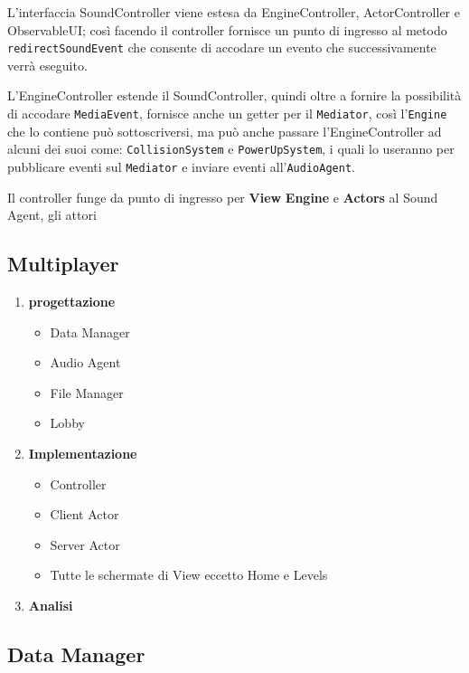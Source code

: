         L'interfaccia SoundController viene estesa da EngineController, ActorController e ObservableUI; così facendo il controller fornisce un punto di ingresso al metodo \texttt{redirectSoundEvent} che consente di accodare un evento che successivamente verrà eseguito.
        
        L'EngineController estende il SoundController, quindi oltre a fornire la possibilità di accodare \texttt{MediaEvent}, fornisce anche un getter per il \texttt{Mediator}, così l'\texttt{Engine} che lo contiene può sottoscriversi, ma può anche passare l'EngineController ad alcuni dei suoi come:
        \texttt{CollisionSystem} e \texttt{PowerUpSystem}, i quali lo useranno per pubblicare eventi sul \texttt{Mediator} e inviare eventi all'\texttt{AudioAgent}.

        
        
        Il controller funge da punto di ingresso per \textbf{View} \textbf{Engine} e \textbf{Actors} al Sound Agent, gli attori 
        
    \subsection{Multiplayer}
        



\begin{enumerate}
    \item \textbf{progettazione}
        \begin{itemize}
	        \item Data Manager
	        \item Audio Agent
	        \item File Manager
        	\item Lobby
        \end{itemize}
    \item \textbf{Implementazione}
        \begin{itemize}
            \item Controller
	        \item Client Actor
	        \item Server Actor
            \item Tutte le schermate di View eccetto Home e Levels
        \end{itemize}
    \item \textbf{Analisi}
\end{enumerate}

\subsection{Data Manager}

